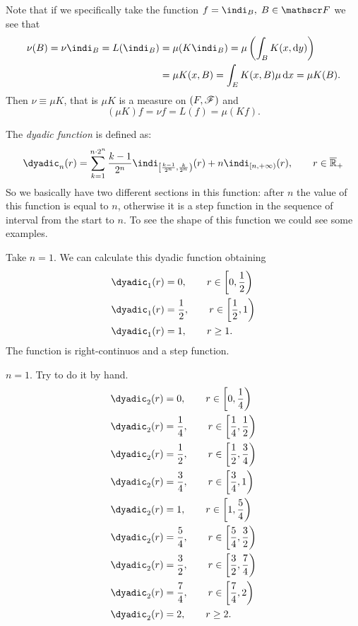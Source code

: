 \documentclass{report}
\begin{document}
\begin{fancyproof}
\begin{enumerate}
	\end{enumerate}
		Note that if we specifically take the function $f=\indi_B,\;B\in\F$ we see that 
	\begin{align*}
		\nu(B)=\nu\indi_B=L(\indi_B)&=\mu(K\indi_B)=\mu\left(\int_BK(x,\dy)\right)\\
		&=\mu K(x,B)=\int_EK(x,B)\mu\dx=\mu K(B).
	\end{align*}
	Then $\nu\equiv \mu K$, that is $\mu K$ is a measure on $(F,\mathscr{F})$ and 
	\[(\mu K)f=\nu f=L(f)=\mu (K f).\] 
\end{fancyproof}
\begin{definition}
	The \emph{dyadic function} is defined as:
	\[
	\dyadic_n(r)=\sum_{k=1}^{n\cdot2^n}\frac{k-1}{2^n}\indi_{\left[\frac{k-1}{2^n},\frac{k}{2^n}\right)}(r)+n\indi_{\left[n,+\infty\right)}(r),\qquad r\in\overline{\R}_+
	\]
	So we basically have two different sections in this function: after $n$ the value of this function is equal to $n$, otherwise it is a step function in the sequence of interval from the start to $n$. To see the shape of this function we could see some examples.
\end{definition}
\begin{example}
	Take $n=1$. We can calculate this dyadic function obtaining
	\begin{align*}
		\dyadic_1(r)&=0,\qquad r\in\left[0,\frac{1}{2}\right)\\
		\dyadic_1(r)&=\frac{1}{2},\qquad r\in\left[\frac{1}{2},1\right)\\
		\dyadic_1(r)&=1,\qquad r\geq1.\\
	\end{align*}
	The function is right-continuos and a step function.
\end{example}
\begin{example}
	$n=1$. Try to do it by hand.
	\begin{align*}
		\dyadic_2(r)&=0,\qquad r\in\left[0,\frac{1}{4}\right)\\
		\dyadic_2(r)&=\frac{1}{4},\qquad r\in\left[\frac{1}{4},\frac{1}{2}\right)\\
		\dyadic_2(r)&=\frac{1}{2},\qquad r\in\left[\frac{1}{2},\frac{3}{4}\right)\\
		\dyadic_2(r)&=\frac{3}{4},\qquad r\in\left[\frac{3}{4},1\right)\\
		\dyadic_2(r)&=1,\qquad r\in\left[1,\frac{5}{4}\right)\\
		\dyadic_2(r)&=\frac{5}{4},\qquad r\in\left[\frac{5}{4},\frac{3}{2}\right)\\
		\dyadic_2(r)&=\frac{3}{2},\qquad r\in\left[\frac{3}{2},\frac{7}{4}\right)\\
		\dyadic_2(r)&=\frac{7}{4},\qquad r\in\left[\frac{7}{4},2\right)\\
		\dyadic_2(r)&=2,\qquad r\geq 2.
	\end{align*}
\end{example}
\end{document}
